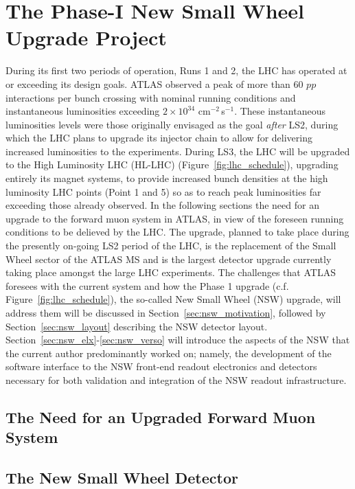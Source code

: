 \chapter{The Phase-I New Small Wheel Upgrade Project}
\label{chap:nsw}

During its first two periods of operation, Runs 1 and 2, the LHC has operated
at or exceeding its design goals.
ATLAS observed a peak of more than 60 $pp$ interactions per bunch crossing with nominal running conditions
and instantaneous luminosities exceeding $2\times 10^{34}$ cm$^{-2}$\,s$^{-1}$.
These instantaneous luminosities levels were those originally envisaged as the goal \textit{after} LS2,
during which the LHC plans to upgrade its injector chain to allow for delivering increased
luminosities to the experiments.
During LS3, the LHC will be upgraded to the High Luminosity LHC (HL-LHC) (Figure~\ref{fig:lhc_schedule}), upgrading entirely
its magnet systems, to provide increased bunch densities at the high luminosity LHC points (Point 1 and 5)
so as to reach peak luminosities far exceeding those already observed.
In the following sections the need for an upgrade to the forward muon system in ATLAS, in view of
the foreseen running conditions to be delieved by the LHC.
The upgrade, planned to take place during the presently on-going LS2 period of the LHC, is
the replacement of the Small Wheel sector of the ATLAS MS and is the largest detector upgrade
currently taking place amongst the large LHC experiments.
The challenges that ATLAS foresees with the current system and how the Phase 1 upgrade (c.f. Figure~\ref{fig:lhc_schedule}), the so-called
New Small Wheel (NSW) upgrade, will address them will be discussed in Section~\ref{sec:nsw_motivation},
followed by Section~\ref{sec:nsw_layout} describing the NSW detector layout.
Section~\ref{sec:nsw_elx}-\ref{sec:nsw_verso} will introduce the aspects of the NSW that the current
author predominantly worked on; namely, the development of the software interface to the NSW front-end readout
electronics and detectors necessary for both validation and integration of the NSW readout infrastructure.

\section{The Need for an Upgraded Forward Muon System}

\section{The New Small Wheel Detector}
